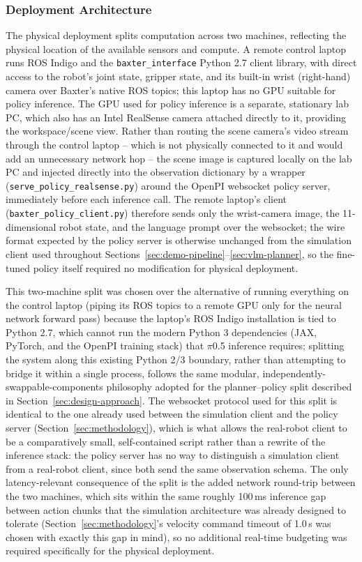 \documentclass[12pt]{article}
\begin{document}
\subsubsection{Deployment Architecture}
The physical deployment splits computation across two machines, reflecting the physical location of the available sensors and compute. A remote control laptop runs ROS Indigo and the \texttt{baxter\_interface} Python 2.7 client library, with direct access to the robot's joint state, gripper state, and its built-in wrist (right-hand) camera over Baxter's native ROS topics; this laptop has no GPU suitable for policy inference. The GPU used for policy inference is a separate, stationary lab PC, which also has an Intel RealSense camera attached directly to it, providing the workspace/scene view. Rather than routing the scene camera's video stream through the control laptop -- which is not physically connected to it and would add an unnecessary network hop -- the scene image is captured locally on the lab PC and injected directly into the observation dictionary by a wrapper (\texttt{serve\_policy\_realsense.py}) around the OpenPI websocket policy server, immediately before each inference call. The remote laptop's client (\texttt{baxter\_policy\_client.py}) therefore sends only the wrist-camera image, the 11-dimensional robot state, and the language prompt over the websocket; the wire format expected by the policy server is otherwise unchanged from the simulation client used throughout Sections~\ref{sec:demo-pipeline}--\ref{sec:vlm-planner}, so the fine-tuned policy itself required no modification for physical deployment.

This two-machine split was chosen over the alternative of running everything on the control laptop (piping its ROS topics to a remote GPU only for the neural network forward pass) because the laptop's ROS Indigo installation is tied to Python 2.7, which cannot run the modern Python 3 dependencies (JAX, PyTorch, and the OpenPI training stack) that $\pi$0.5 inference requires; splitting the system along this existing Python 2/3 boundary, rather than attempting to bridge it within a single process, follows the same modular, independently-swappable-components philosophy adopted for the planner--policy split described in Section~\ref{sec:design-approach}. The websocket protocol used for this split is identical to the one already used between the simulation client and the policy server (Section~\ref{sec:methodology}), which is what allows the real-robot client to be a comparatively small, self-contained script rather than a rewrite of the inference stack: the policy server has no way to distinguish a simulation client from a real-robot client, since both send the same observation schema. The only latency-relevant consequence of the split is the added network round-trip between the two machines, which sits within the same roughly 100\,ms inference gap between action chunks that the simulation architecture was already designed to tolerate (Section~\ref{sec:methodology}'s velocity command timeout of 1.0\,s was chosen with exactly this gap in mind), so no additional real-time budgeting was required specifically for the physical deployment.
\end{document}
